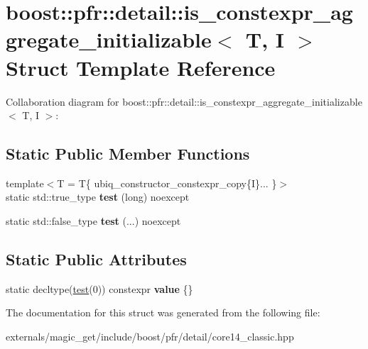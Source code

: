 \hypertarget{structboost_1_1pfr_1_1detail_1_1is__constexpr__aggregate__initializable}{}\section{boost\+:\+:pfr\+:\+:detail\+:\+:is\+\_\+constexpr\+\_\+aggregate\+\_\+initializable$<$ T, I $>$ Struct Template Reference}
\label{structboost_1_1pfr_1_1detail_1_1is__constexpr__aggregate__initializable}


Collaboration diagram for boost\+:\+:pfr\+:\+:detail\+:\+:is\+\_\+constexpr\+\_\+aggregate\+\_\+initializable$<$ T, I $>$\+:
\subsection*{Static Public Member Functions}
\begin{DoxyCompactItemize}
\item 
\mbox{\label{structboost_1_1pfr_1_1detail_1_1is__constexpr__aggregate__initializable_a32446d7c5b36d261b2dc327f4e9617fd}} 
{\footnotesize template$<$T  = T\{ ubiq\+\_\+constructor\+\_\+constexpr\+\_\+copy\{\+I\}... \}$>$ }\\static std\+::true\+\_\+type {\bfseries test} (long) noexcept
\item 
\mbox{\label{structboost_1_1pfr_1_1detail_1_1is__constexpr__aggregate__initializable_ac70a92c075e65b8a1ed4c7973e873415}} 
static std\+::false\+\_\+type {\bfseries test} (...) noexcept
\end{DoxyCompactItemize}
\subsection*{Static Public Attributes}
\begin{DoxyCompactItemize}
\item 
\mbox{\label{structboost_1_1pfr_1_1detail_1_1is__constexpr__aggregate__initializable_a924cc9c92989d680c29ffcfba1f01f61}} 
static decltype(\mbox{\hyperlink{structtest}{test}}(0)) constexpr {\bfseries value} \{\}
\end{DoxyCompactItemize}


The documentation for this struct was generated from the following file\+:\begin{DoxyCompactItemize}
\item 
externals/magic\+\_\+get/include/boost/pfr/detail/core14\+\_\+classic.\+hpp\end{DoxyCompactItemize}
